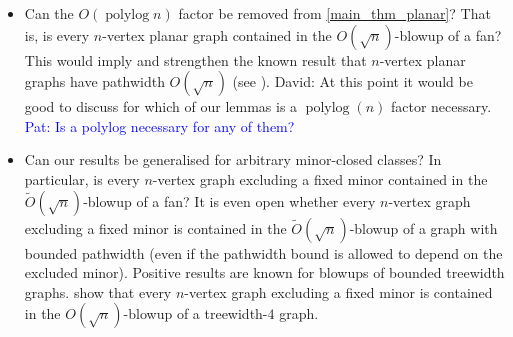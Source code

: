 \documentclass{patmorin}
\newcommand{\david}[1]{{\color{orange} David: #1}}
\newcommand{\pat}[1]{\textcolor{Blue}{Pat: #1}}
\DeclareMathOperator{\polylog}{polylog}
\begin{document}
%

\begin{itemize}
\item Can the $O(\polylog n)$ factor be removed from \cref{main_thm_planar}? That is, is every $n$-vertex planar graph contained in the $O(\sqrt{n})$-blowup of a fan? This would imply and strengthen the known result that $n$-vertex planar graphs have pathwidth $O(\sqrt{n})$ (see \citep{Bodlaender98}). \david{At this point it would be good to discuss for which of our lemmas is a $\polylog(n)$ factor necessary.} \pat{Is a polylog necessary for any of them?}

\item Can our results be generalised for arbitrary minor-closed classes? In particular, is every $n$-vertex  graph excluding a fixed minor contained in the $\tilde{O}(\sqrt{n})$-blowup of a fan? It is even open  whether every $n$-vertex graph excluding a fixed minor is contained in the $\tilde{O}(\sqrt{n})$-blowup of a graph with bounded pathwidth (even if the pathwidth bound is allowed to depend on the excluded minor).  Positive results are known for blowups of bounded treewidth graphs. \citet{distel.dujmovic.ea:product} show that every $n$-vertex graph excluding a fixed minor is contained in the $O(\sqrt{n})$-blowup of a treewidth-$4$ graph.
\end{itemize}
\end{document}
